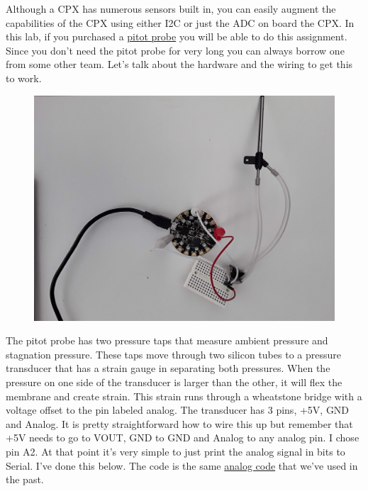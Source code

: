 Although a CPX has numerous sensors built in, you can easily augment the capabilities of the CPX using either I2C or just the ADC on board the CPX. In this lab, if you purchased a \href{https://www.amazon.com/Hobbypower-Airspeed-MPXV7002DP-Differential-controller/dp/B00WSFWO36/ref=sr_1_3?dchild=1&keywords=Airspeed+sensor+kit&qid=1590532161&sr=8-3}{pitot probe} you will be able to do this assignment. Since you don’t need the pitot probe for very long you can always borrow one from some other team. Let’s talk about the hardware and the wiring to get this to work.
\begin{figure}[H]
  \begin{center}
    \includegraphics[width=\textwidth]{Figures/pitot_probe_circuit.jpeg}
  \end{center}
\end{figure}
The pitot probe has two pressure taps that measure ambient pressure and stagnation pressure. These taps move through two silicon tubes to a pressure transducer that has a strain gauge in separating both pressures. When the pressure on one side of the transducer is larger than the other, it will flex the membrane and create strain. This strain runs through a wheatstone bridge with a voltage offset to the pin labeled analog. The transducer has 3 pins, +5V, GND and Analog. It is pretty straightforward how to wire this up but remember that +5V needs to go to VOUT, GND to GND and Analog to any analog pin. I chose pin A2. At that point it’s very simple to just print the analog signal in bits to Serial. I’ve done this below. The code is the same \href{https://github.com/cmontalvo251/Microcontrollers/blob/master/Circuit_Playground/CircuitPython/Analog/analog_simple.py}{analog code} that we’ve used in the past.
